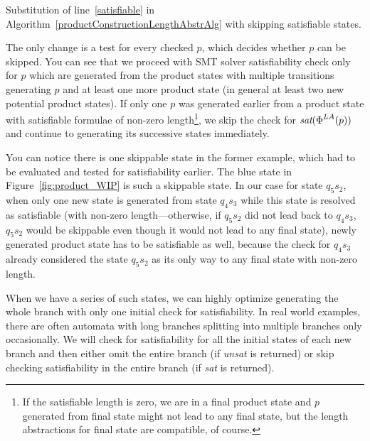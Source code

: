 \begin{algorithm}
    \caption{Substitution of line~\ref{satisfiable} in Algorithm~\ref{productConstructionLengthAbstrAlg} with skipping satisfiable states.} \label{productConstructionLengthAbstrAlgSkip}
    \DontPrintSemicolon
\end{algorithm}

The only change is a test for every checked $p$, which decides whether $p$ can be skipped. You can see that we proceed with SMT solver satisfiability check only for $p$ which are generated from the product states with multiple transitions generating $p$ and at least one more product state (in general at least two new potential product states). If only one $p$ was generated earlier from a product state with satisfiable formulae of non-zero length\footnote{If the satisfiable length is zero, we are in a final product state and $p$ generated from final state might not lead to any final state, but the length abstractions for final state are compatible, of course.}, we skip the check for $\emph{sat}(\emph{$\Phi$}^{LA}(p))$ and continue to generating its successive states immediately.

You can notice there is one skippable state in the former example, which had to be evaluated and tested for satisfiability earlier. The blue state in Figure~\ref{fig:product_WIP} is such a skippable state. In our case for state $q_5s_2$, when only one new state is generated from state $q_4s_3$ while this state is resolved as satisfiable (with non-zero length---otherwise, if $q_5s_2$ did not lead back to $q_4s_3$, $q_5s_2$ would be skippable even though it would not lead to any final state), newly generated product state has to be satisfiable as well, because the check for $q_4s_3$ already considered the state $q_5s_2$ as its only way to any final state with non-zero length.

When we have a series of such states, we can highly optimize generating the whole branch with only one initial check for satisfiability. In real world examples, there are often automata with long branches splitting into multiple branches only occasionally. We will check for satisfiability for all the initial states of each new branch and then either omit the entire branch (if \emph{unsat} is returned) or skip checking satisfiability in the entire branch (if \emph{sat} is returned).

